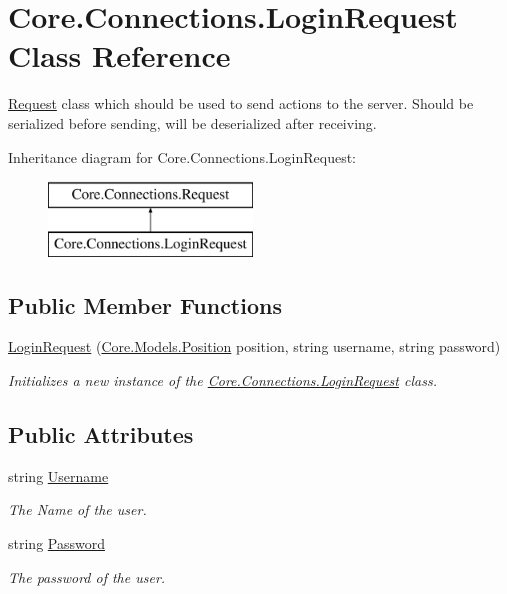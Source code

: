 \hypertarget{classCore_1_1Connections_1_1LoginRequest}{}\section{Core.\+Connections.\+Login\+Request Class Reference}
\label{classCore_1_1Connections_1_1LoginRequest}


\hyperlink{classCore_1_1Connections_1_1Request}{Request} class which should be used to send actions to the server. Should be serialized before sending, will be deserialized after receiving.  


Inheritance diagram for Core.\+Connections.\+Login\+Request\+:\begin{figure}[H]
\begin{center}
\leavevmode
\includegraphics[height=2.000000cm]{classCore_1_1Connections_1_1LoginRequest}
\end{center}
\end{figure}
\subsection*{Public Member Functions}
\begin{DoxyCompactItemize}
\item 
\hyperlink{classCore_1_1Connections_1_1LoginRequest_a5358029b8a55dfbcdd7567f1b812d399}{Login\+Request} (\hyperlink{classCore_1_1Models_1_1Position}{Core.\+Models.\+Position} position, string username, string password)
\begin{DoxyCompactList}\small\item\em Initializes a new instance of the \hyperlink{classCore_1_1Connections_1_1LoginRequest}{Core.\+Connections.\+Login\+Request} class. \end{DoxyCompactList}\end{DoxyCompactItemize}
\subsection*{Public Attributes}
\begin{DoxyCompactItemize}
\item 
string \hyperlink{classCore_1_1Connections_1_1LoginRequest_aead391392278a11f91e5570e44942f91}{Username}
\begin{DoxyCompactList}\small\item\em The Name of the user. \end{DoxyCompactList}\item 
string \hyperlink{classCore_1_1Connections_1_1LoginRequest_af3a2a4f734dcca3404687bfb8844b2ee}{Password}
\begin{DoxyCompactList}\small\item\em The password of the user. \end{DoxyCompactList}\end{DoxyCompactItemize}


